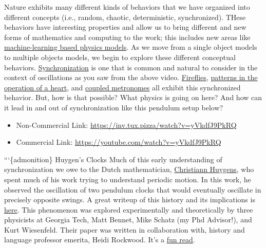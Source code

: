 Nature exhibits many different kinds of behaviors that we have organized
into different concepts (i.e., random, chaotic, deterministic,
synchronized). THese behaviors have interesting properties and allow us
to bring different and new forms of mathematics and computing to the
work; this includes new areas like
\href{https://inv.tux.pizza/watch?v=2Bw5f4vYL98}{machine-learning based
physics models}. As we move from a single object models to multiple
objects models, we begin to explore these different conceptual
behaviors.
\href{https://www.quantamagazine.org/physicists-discover-exotic-patterns-of-synchronization-20190404/}{Synchronization}
is one that is common and natural to consider in the context of
oscillations as you saw from the above video.
\href{https://inv.tux.pizza/watch?v=ZGvtnE1Wy6U}{Fireflies},
\href{https://inv.tux.pizza/watch?v=2LPboySOSvo}{patterns in the
operation of a heart}, and
\href{https://inv.tux.pizza/watch?v=5v5eBf2KwF8}{coupled metronomes} all
exhibit this synchronized behavior. But, how is that possible? What
physics is going on here? And how can it lead in and out of
synchronization like this pendulum setup below?

\href{https://inv.tux.pizza/watch?v=yVkdfJ9PkRQ}{\pandocbounded{\texttt{[image: https://markdown-videos-api.jorgenkh.no/youtube/yVkdfJ9PkRQ?width=720\&height=405]}}}

\begin{itemize}
\tightlist
\item
  Non-Commercial Link: \url{https://inv.tux.pizza/watch?v=yVkdfJ9PkRQ}
\item
  Commercial Link: \url{https://youtube.com/watch?v=yVkdfJ9PkRQ}
\end{itemize}

```\{admonition\} Huygen's Clocks Much of this early understanding of
synchronization we owe to the Dutch mathematician,
\href{https://en.wikipedia.org/wiki/Christiaan_Huygens}{Christiann
Huygens}, who spent much of his work trying to understand periodic
motion. In this work, he observed the oscillation of two pendulum clocks
that would eventually oscillate in precisely opposite swings. A great
writeup of this history and its implications is
\href{https://www.quantamagazine.org/physicists-discover-exotic-patterns-of-synchronization-20190404/}{here}.
This phenomenon was explored experimentally and theoretically by three
physicists at Georgia Tech, Matt Bennet, Mike Schatz (my Phd Advisor!),
and Kurt Wiesenfeld. Their paper was written in collaboration with,
history and language professor emerita, Heidi Rockwood. It's a
\href{http://engineering.nyu.edu/mechatronics/Control_Lab/bck/VKapila/Chaotic\%20Ref/Hujgens.pdf}{fun
read}.

